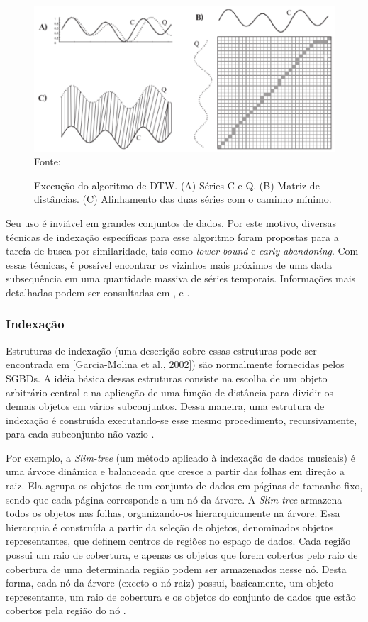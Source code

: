 \begin{figure}[!htb]
   \centering
   \caption{Execução do algoritmo de DTW. (A) Séries C e Q. (B) Matriz de distâncias. (C) Alinhamento das duas séries com o caminho mínimo.}\label{fig:dtw} 
   \includegraphics[scale=0.40]{figuras/dtw.png}
   \\Fonte: \cite{keogh2004}
\end{figure}

Seu uso é inviável em grandes conjuntos de dados. Por este motivo, diversas técnicas de indexação específicas para esse algoritmo foram propostas para a tarefa de busca por similaridade, tais como \textit{lower bound} e \textit{early abandoning}. Com essas técnicas, é possível encontrar os vizinhos mais próximos de uma dada subsequência em uma quantidade massiva de séries temporais. Informações mais detalhadas podem ser consultadas em \cite{mizutani2006}, \cite{kruskal1983} e \cite{juang1991}.

\subsubsection{Indexação}\label{subsubsec:indexacao}
Estruturas de indexação (uma descrição sobre essas estruturas pode ser encontrada em [Garcia-Molina et al., 2002]) são normalmente fornecidas pelos SGBDs. A idéia básica dessas estruturas consiste na escolha de um objeto arbitrário central e na aplicação de uma função de distância para dividir os demais objetos em vários subconjuntos. Dessa maneira, uma estrutura de indexação é construída executando-se esse mesmo procedimento, recursivamente, para cada subconjunto não vazio \cite{barioni2006}.

Por exemplo, a \textit{Slim-tree} (um método aplicado à indexação de dados musicais) é uma árvore dinâmica e balanceada que cresce a partir das folhas em direção a raiz. Ela agrupa os objetos de um conjunto de dados em páginas de tamanho fixo, sendo que cada página corresponde a um nó da árvore. A \textit{Slim-tree} armazena todos os objetos nas folhas, organizando-os hierarquicamente na árvore. Essa hierarquia é construída a partir da seleção de objetos, denominados objetos representantes, que definem centros de regiões no espaço de dados. Cada região possui um raio de cobertura, e apenas os objetos que forem cobertos pelo raio de cobertura de uma determinada região podem ser armazenados nesse nó. Desta forma, cada nó da árvore
(exceto o nó raiz) possui, basicamente, um objeto representante, um raio de cobertura e os objetos do conjunto de dados que estão cobertos pela região do nó \cite{traina2000}.

